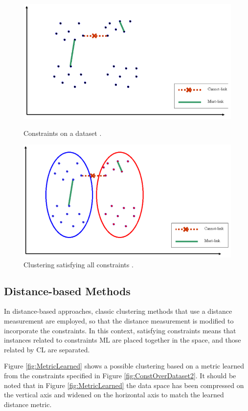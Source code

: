 \begin{figure}[bth]
	\myfloatalign
	{\includegraphics[width=.6\linewidth]{gfx/ConstClust/InputInstancesAndConst1}
	\caption[Constraints on a dataset.]{Constraints on a dataset \cite{davidson2007survey}.} \label{fig:ConstOverDataset}
	}
	{\includegraphics[width=.6\linewidth]{gfx/ConstClust/ClusteringSatAll}
	\caption[Clustering satisfying all constraints.]{Clustering satisfying all constraints \cite{davidson2007survey}.} \label{fig:ClusteringSatAllConst}
	}
\end{figure}

\subsection{Distance-based Methods}

In distance-based approaches, classic clustering methods that use a distance measurement are employed, so that the distance measurement is modified to incorporate the constraints. In this context, satisfying constraints means that instances related to constraints \acs{ML} are placed together in the space, and those related by \acs{CL} are separated.

Figure \ref{fig:MetricLearned} shows a possible clustering based on a metric learned from the constraints specified in Figure \ref{fig:ConstOverDataset2}. It should be noted that in Figure \ref{fig:MetricLearned} the data space has been compressed on the vertical axis and widened on the horizontal axis to match the learned distance metric.

